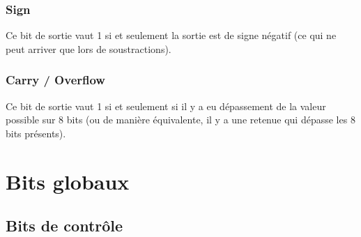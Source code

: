\documentclass[twoside, 12pt, a4paper]{article}
\begin{document}
        \subsubsection{Sign}
        Ce bit de sortie vaut 1 si et seulement la sortie est de signe négatif (ce qui ne peut arriver que lors de soustractions).

        \subsubsection{Carry / Overflow}
        Ce bit de sortie vaut 1 si et seulement si il y a eu dépassement de la valeur possible sur 8 bits (ou de manière équivalente, il y a une retenue qui dépasse les 8 bits présents).
        
\clearpage
    
\section{Bits globaux}

\subsection{Bits de contrôle}
\end{document}

